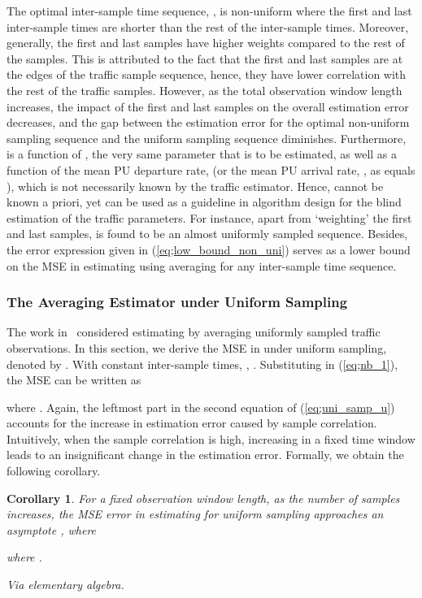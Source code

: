 \documentclass[11pt,draftclsnofoot,journal,onecolumn]{IEEEtran}
\newtheorem{corollary}{Corollary}
\begin{document}
The optimal inter-sample time sequence, , is non-uniform where the first and last inter-sample times are shorter than the rest of the inter-sample times. Moreover, generally, the first and last samples have higher weights compared to the rest of the samples. This is attributed to the fact that the first and last samples are at the edges of the traffic sample sequence, hence, they have lower correlation with the rest of the traffic samples. However, as the total observation window length increases, the impact of the first and last samples on the overall estimation error decreases, and the gap between the estimation error for the optimal non-uniform sampling sequence and the uniform sampling sequence diminishes. Furthermore,  is a function of , the very same parameter that is to be estimated, as well as a function of the mean PU departure rate,  (or the mean PU arrival rate, , as  equals ), which is not necessarily known by the traffic estimator. Hence,  cannot be known a priori, yet  can be used as a guideline in algorithm design for the blind estimation of the traffic parameters. For instance, apart from `weighting' the first and last samples,  is found to be an almost uniformly sampled sequence. Besides, the error expression given in (\ref{eq;low_bound_non_uni}) serves as a lower bound on the MSE in estimating  using averaging for any inter-sample time sequence.

\subsubsection{The Averaging Estimator under Uniform Sampling}
\label{sec:mse_u}

The work in~\cite{kim_tmc_2008,kim_dyspan_2008,liang_ita_2010,liang_tmc_2011} considered estimating  by averaging uniformly sampled traffic observations. In this section, we derive the MSE in  under uniform sampling, denoted by . With constant inter-sample times, , . Substituting in (\ref{eq;nb_1}), the MSE can be written as

where . Again, the leftmost part in the second equation of (\ref{eq;uni_samp_u}) accounts for the increase in estimation error caused by sample correlation. Intuitively, when the sample correlation is high, increasing  in a fixed time window leads to an insignificant change in the estimation error. Formally, we obtain the following corollary.
\begin{corollary}
\label{th:v_ul}
For a fixed observation window length, as the number of samples increases, the MSE error in estimating  for uniform sampling approaches an asymptote , where

where .
\begin{IEEEproof}
Via elementary algebra.
\end{IEEEproof}
\end{corollary}
\end{document}

